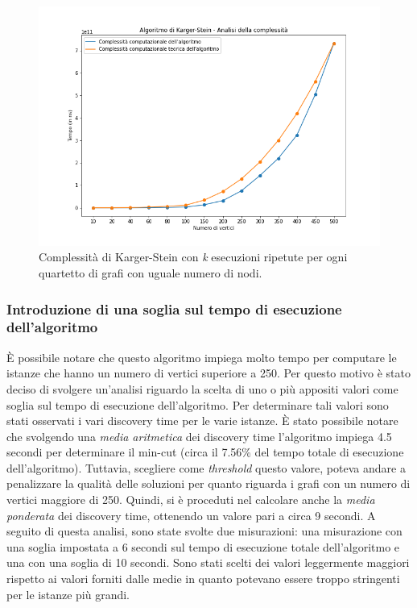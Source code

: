 \begin{figure}[H]
	\centering
	\includegraphics[width=1\textwidth]{res/images/single/karger-stein/complexity/karger_stein_complexity.png}
	\caption{Complessità di Karger-Stein con \textit{k} esecuzioni ripetute per ogni quartetto di grafi con uguale numero di nodi.}
	\label{fig:kargerstein}
\end{figure}

\subsubsection{Introduzione di una soglia sul tempo di esecuzione dell'algoritmo}

È possibile notare che questo algoritmo impiega molto tempo per computare le istanze 
che hanno un numero di vertici superiore a 250. Per questo motivo è stato 
deciso di svolgere un'analisi riguardo la scelta di uno o più appositi valori come 
soglia sul tempo di esecuzione dell'algoritmo. Per determinare tali valori sono stati 
osservati i vari discovery time per le varie istanze. È stato possibile notare che 
svolgendo una \textit{media aritmetica} dei discovery time l'algoritmo 
impiega 4.5 secondi per determinare il min-cut (circa il 7.56\% del tempo totale 
di esecuzione dell'algoritmo). Tuttavia, scegliere come \textit{threshold} questo 
valore, poteva andare a penalizzare la qualità delle soluzioni per quanto riguarda 
i grafi con un numero di vertici maggiore di 250. Quindi, si è proceduti nel calcolare 
anche la \textit{media ponderata} dei discovery time, ottenendo un valore pari a 
circa 9 secondi. A seguito di questa analisi, sono state svolte due misurazioni: una 
misurazione con una soglia impostata a 6 secondi sul tempo di esecuzione totale 
dell'algoritmo e una con una soglia di 10 secondi. Sono stati scelti dei valori 
leggermente maggiori rispetto ai valori forniti dalle medie in quanto potevano 
essere troppo stringenti per le istanze più grandi.

